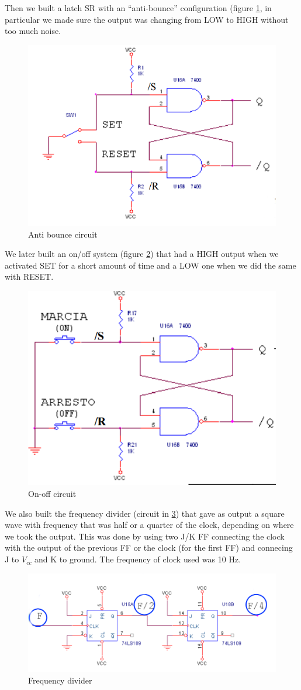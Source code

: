 Then we  built a latch SR with an ``anti-bounce'' configuration (figure \ref{bounce}, in particular we made sure the output was changing from LOW to HIGH without too much noise.
\begin{figure}[H]
\centering
\includegraphics[width=.7\textwidth]{11/bounce.png}
\caption{Anti bounce circuit}\label{bounce}

\end{figure}
We later built an on/off system (figure \ref{ON_OFF}) that had a HIGH output when we activated SET for a short amount of time and a LOW one when we did the same with RESET.
\begin{figure}[H]
\centering
\includegraphics[width=.5\textwidth]{11/ON_OFF.png}
\caption{On-off circuit}\label{ON_OFF}

\end{figure}
We also built the frequency divider (circuit in \ref{f_div}) that gave as output a square wave with frequency that was half or a quarter of the clock, depending on where we took the output. This was done by using two J/K FF connecting the clock with the output of the previous  FF or the clock (for the first FF) and connecing J to $V_{cc}$ and K to ground. The frequency of clock used was 10 Hz.
\begin{figure}[H]
\centering
\includegraphics[width=.7\textwidth]{11/f_div.png}
\caption{Frequency divider}\label{f_div}
\end{figure}
